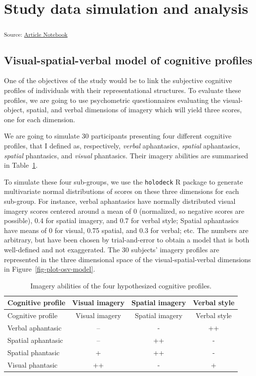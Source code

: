 \documentclass[
  authoryear]{elsarticle}
\begin{document}
\section{Study data simulation and
analysis}\label{study-data-simulation-and-analysis}

\textsubscript{Source:
\href{https://m-delem.github.io/2499-similarity-manuscript/index.qmd.html}{Article
Notebook}}

\subsection{Visual-spatial-verbal model of cognitive
profiles}\label{visual-spatial-verbal-model-of-cognitive-profiles}

One of the objectives of the study would be to link the subjective
cognitive profiles of individuals with their representational
structures. To evaluate these profiles, we are going to use psychometric
questionnaires evaluating the visual-object, spatial, and verbal
dimensions of imagery which will yield three scores, one for each
dimension.

We are going to simulate 30 participants presenting four different
cognitive profiles, that I defined as, respectively, \emph{verbal}
aphantasics, \emph{spatial} aphantasics, \emph{spatial} phantasics, and
\emph{visual} phantasics. Their imagery abilities are summarised in
Table~\ref{tbl-imageries}.

To simulate these four sub-groups, we use the \texttt{holodeck} R
package to generate multivariate normal distributions of scores on these
three dimensions for each sub-group. For instance, verbal aphantasics
have normally distributed visual imagery scores centered around a mean
of 0 (normalized, so negative scores are possible), 0.4 for spatial
imagery, and 0.7 for verbal style; Spatial aphantasics have means of 0
for visual, 0.75 spatial, and 0.3 for verbal; etc. The numbers are
arbitrary, but have been chosen by trial-and-error to obtain a model
that is both well-defined and not exaggerated. The 30 subjects' imagery
profiles are represented in the three dimensional space of the
visual-spatial-verbal dimensions in Figure~\ref{fig-plot-osv-model}.

\begin{longtable}[]{@{}lccc@{}}
\caption{Imagery abilities of the four hypothesized cognitive
profiles.}\label{tbl-imageries}\tabularnewline
\toprule\noalign{}
Cognitive profile & Visual imagery & Spatial imagery & Verbal style \\
\midrule\noalign{}
\endfirsthead
\toprule\noalign{}
Cognitive profile & Visual imagery & Spatial imagery & Verbal style \\
\midrule\noalign{}
\endhead
\bottomrule\noalign{}
\endlastfoot
Verbal aphantasic & -- & - & ++ \\
Spatial aphantasic & -- & ++ & - \\
Spatial phantasic & + & ++ & - \\
Visual phantasic & ++ & - & + \\
\end{longtable}
\end{document}
